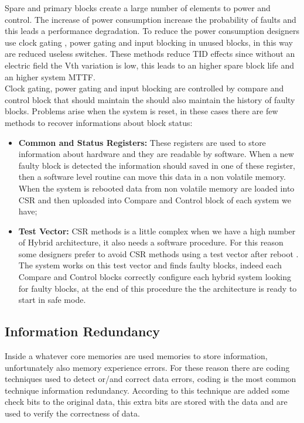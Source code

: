 {{{{		       Spare and primary blocks create a large number of elements to power and control. 
		       The increase of power consumption increase the probability of faults  and this leads a performance degradation. 
		       To reduce the power consumption designers use clock gating , power gating and input blocking in unused blocks, in this way are reduced useless switches. These methods reduce TID effects since without an electric field the Vth variation is low, this leads to an higher spare block life and an higher system MTTF.\\
		       
		       
		       Clock gating, power gating and input blocking are controlled by compare and control block that should maintain the should also maintain the history of faulty blocks. Problems arise when the system is reset, in these cases there are few methods to recover informations about block status:
		       \begin{itemize}
		           \item \textbf{Common and Status Registers:} These registers are used to store information about hardware and they are readable by software. When a new faulty block is detected the information should saved in one of these register, then a software level routine can move this data in a non volatile memory. When the system is rebooted data from non volatile memory are loaded into CSR and then uploaded into Compare and Control block of each system we have;
		           \item \textbf{Test Vector:} CSR methods is a little complex when we have a high number of Hybrid architecture, it also needs a software procedure. For this reason some designers prefer to avoid CSR methods using a test vector after reboot  . The system works on this test vector and finds faulty blocks, indeed each Compare and Control blocks correctly configure each hybrid system looking for faulty blocks, at the end of this procedure the the architecture is ready to start in safe mode.
		       \end{itemize}
		    }
		    
		}
		\subsection{Information Redundancy}{
			Inside a whatever core memories are used memories to store information, unfortunately also memory experience errors.
		    For these reason there are coding techniques used to detect or/and correct data errors, coding is the most common technique information redundancy. 
		    According to this technique are added some check bits to the original data, this extra bits are stored with the data and are used to verify the correctness of data.\\
		    
}}}
